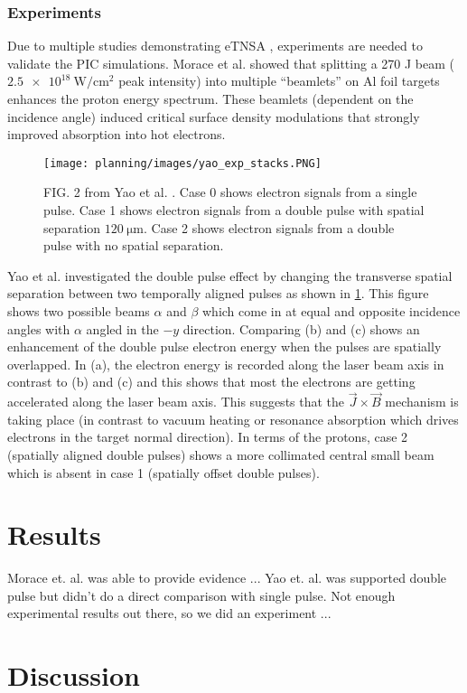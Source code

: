 
\subsubsection{Experiments}

Due to multiple studies demonstrating eTNSA \cite{Ferri_2019_Nat_Comm,Rahman_2021_PoP,Khan_2024_NJoP}, experiments are needed to validate the PIC simulations. Morace et al. \cite{Morace_2019_Nat_Comm} showed that splitting a 270 J beam ($\SI{2.5e18}{\watt \per \centi \meter \squared}$ peak intensity) into multiple ``beamlets'' on Al foil targets enhances the proton energy spectrum. These beamlets (dependent on the incidence angle) induced critical surface density modulations that strongly improved absorption into hot electrons. 

\begin{figure}
	\centering 
	\texttt{[image: planning/images/yao\_exp\_stacks.PNG]}
	\caption{FIG. 2 from Yao et al. \cite{Yao_2024_MaRaE}. Case 0 shows electron signals from a single pulse. Case 1 shows electron signals from a double pulse with spatial separation $\SI{120}{\micro \meter}$. Case 2 shows electron signals from a double pulse with no spatial separation.}
	\label{fig:yao_exp_stacks}
\end{figure}

Yao et al. \cite{Yao_2024_MaRaE} investigated the double pulse effect by changing the transverse spatial separation between two temporally aligned pulses as shown in \cref{fig:yao_exp_stacks}. This figure shows two possible beams $\alpha$ and $\beta$ which come in at equal and opposite incidence angles with $\alpha$ angled in the $-y$ direction. Comparing (b) and (c) shows an enhancement of the double pulse electron energy when the pulses are spatially overlapped. In (a), the electron energy is recorded along the laser beam axis in contrast to (b) and (c) and this shows that most the electrons are getting accelerated along the laser beam axis. This suggests that the $\vec{J} \times \vec{B}$ mechanism is taking place (in contrast to vacuum heating or resonance absorption which drives electrons in the  target normal direction). In terms of the protons, case 2 (spatially aligned double pulses) shows a more collimated central small beam which is absent in case 1 (spatially offset double pulses).

\section{Results}
Morace et. al. \cite{Morace_2019_Nat_Comm} was able to provide evidence ... Yao et. al. \cite{Yao_2024_MaRaE} was supported double pulse but didn't do a direct comparison with single pulse. Not enough experimental results out there, so we did an experiment ...

\section{Discussion}

